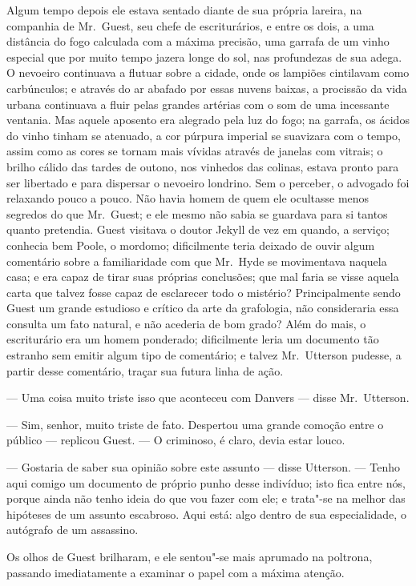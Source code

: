 Algum tempo depois ele estava sentado diante de sua própria lareira, na
companhia de Mr.~Guest, seu chefe de escriturários, e entre os dois, a
uma distância do fogo calculada com a máxima precisão, uma garrafa de
um vinho especial que por muito tempo jazera longe do sol, nas
profundezas de sua adega.  O nevoeiro continuava a flutuar sobre a
cidade, onde os lampiões cintilavam como carbúnculos; e através do ar
abafado por essas nuvens baixas, a procissão da vida urbana continuava
a fluir pelas grandes artérias com o som de uma incessante ventania. 
Mas aquele aposento era alegrado pela luz do fogo; na garrafa, os
ácidos do vinho tinham se atenuado, a cor púrpura imperial se suavizara
com o tempo, assim como as cores se tornam mais vívidas através de
janelas com vitrais; o brilho cálido das tardes de outono, nos vinhedos
das colinas, estava pronto para ser libertado e para dispersar o
nevoeiro londrino.  Sem o perceber, o advogado foi relaxando pouco a
pouco.  Não havia homem de quem ele ocultasse menos segredos do que Mr.~Guest; 
e ele mesmo não sabia se guardava para si tantos quanto
pretendia.  Guest visitava o doutor Jekyll de vez em quando, a serviço;
conhecia bem Poole, o mordomo; dificilmente teria deixado de ouvir
algum comentário sobre a familiaridade com que Mr.~Hyde se movimentava
naquela casa; e era capaz de tirar suas próprias conclusões; que mal
faria se visse aquela carta que talvez fosse capaz de esclarecer todo o
mistério? Principalmente sendo Guest um grande estudioso e crítico da
arte da grafologia, não consideraria essa consulta um fato natural, e
não acederia de bom grado?  Além do mais, o escriturário era um homem
ponderado; dificilmente leria um documento tão estranho sem emitir
algum tipo de comentário; e talvez Mr.~Utterson pudesse, a partir desse
comentário, traçar sua futura linha de ação.

--- Uma coisa muito triste isso que aconteceu com Danvers --- disse Mr.~Utterson.

--- Sim, senhor, muito triste de fato.  Despertou uma grande comoção
entre o público --- replicou Guest. --- O criminoso, é claro, devia estar
louco.

--- Gostaria de saber sua opinião sobre este assunto --- disse Utterson. ---
Tenho aqui comigo um documento de próprio punho desse indivíduo; isto
fica entre nós,  porque ainda não tenho ideia do que vou fazer com ele;
e trata"-se na melhor das hipóteses de um assunto escabroso.  Aqui está:
algo dentro de sua especialidade, o autógrafo de um assassino.

Os olhos de Guest brilharam, e ele sentou"-se mais aprumado na poltrona,
passando imediatamente a examinar o papel com a máxima atenção.

